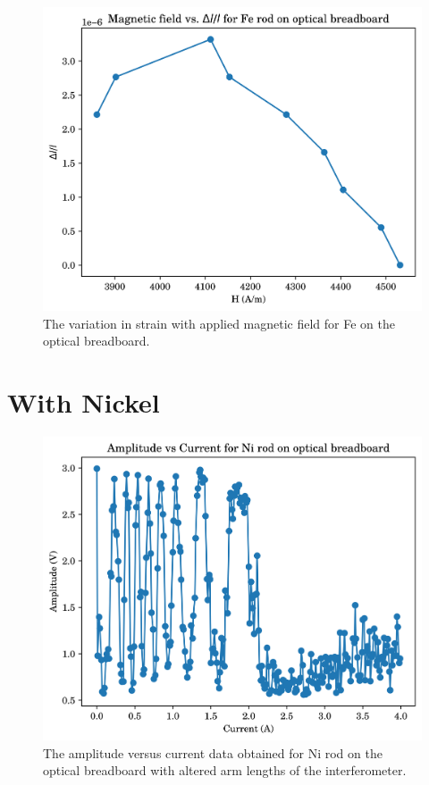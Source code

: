 \begin{figure}
	\centering
	\includegraphics{data/ob-Fe-1}
	\caption{The variation in strain with applied magnetic field for Fe on the optical breadboard.}
	\label{fig:ob-fe-1}
\end{figure}

\section{With Nickel}
\begin{figure}
	\centering
	\includegraphics{data/ob-Ni-0}
	\caption{The amplitude versus current data obtained for Ni rod on the optical breadboard with altered arm lengths of the interferometer.}
	\label{fig:ob-ni-0}
\end{figure}

